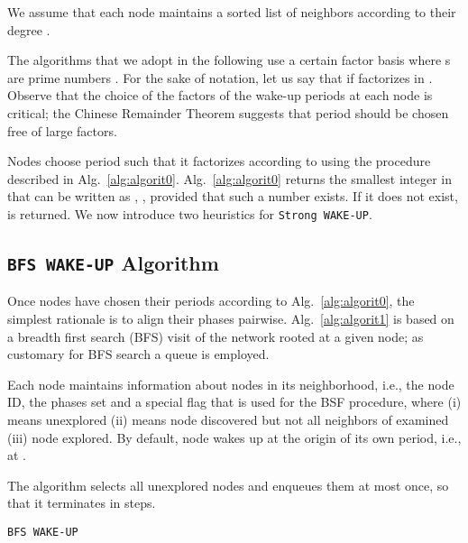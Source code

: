 We assume that each node  maintains a sorted list of neighbors  according to their degree . 


The algorithms that we adopt in the following use a certain factor basis  where s are 
prime numbers \cite{koblitz}. For the sake of notation, let us say that  if  factorizes in . Observe that the choice of the factors of the wake-up periods at each node is critical; the Chinese Remainder 
Theorem suggests that period  should be chosen free of large factors. 




Nodes choose period  such that it factorizes according to  using the procedure described 
in Alg.~\ref{alg:algorit0}. Alg.~\ref{alg:algorit0} returns the smallest integer in  that can be written 
as , , provided that such a number exists. If it does not exist, 
is returned. We now introduce two heuristics for {\tt Strong WAKE-UP}.


\subsection{{\tt BFS WAKE-UP} Algorithm}\label{sec:equential}


Once nodes have chosen their periods according to Alg.~\ref{alg:algorit0}, the simplest rationale is 
to align their phases pairwise. Alg.~\ref{alg:algorit1} is based on a breadth first 
search (BFS) visit of the network rooted at a given node; as customary for BFS search 
a queue  is employed.  

Each node  maintains information about nodes in its neighborhood, i.e., the node ID, the phases 
set  and a special flag  that is used for the BSF procedure, where (i)  means  
unexplored (ii)  means node  discovered but not all neighbors of  examined (iii)  
node  explored. By 
default, node  wakes up at the origin of its own period, i.e., at . 



The algorithm selects all unexplored nodes and enqueues them at most once, so that it terminates in  steps. 

\begin{algorithm}[t]
\caption{\tt BFS WAKE-UP}
\label{alg:algorit1}
\begin{algorithmic}[1]
\REQUIRE {  } \FORALL {}
\STATE 
\STATE   \ENDFOR
{}
\STATE   
\STATE       {}
\STATE  {}
\FORALL {}
\STATE   {}
\STATE   {}  
\STATE    {} 
\STATE  {}
\STATE  {}          
\ENDIF
\ENDFOR
\STATE      {}
\STATE     {}
\STATE      {}            
\ENDWHILE 
\end{algorithmic}
\end{algorithm}



